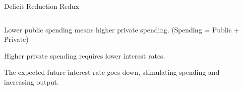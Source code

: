 \documentclass[shownotes,11pt, aspectratio=169]{beamer}
\newenvironment{wideitemize}{\itemize\addtolength{\itemsep}{10pt}}{\enditemize}
\begin{document}
\begin{frame}{Deficit Reduction Redux}
\begin{columns}[T] %
\begin{column}{.52\textwidth}
  \begin{wideitemize}
   \item Lower public spending means higher private spending. (Spending = Public + Private)
   \pause
   \item Higher private spending requires lower interest rates.     
   \pause
   \item The expected future interest rate goes down, stimulating spending and increasing output.
   \end{wideitemize}
\end{column}%
\pause
\hfill%
\begin{column}{.44\textwidth}
\end{column}%
\end{columns}
\end{frame}
\end{document}
